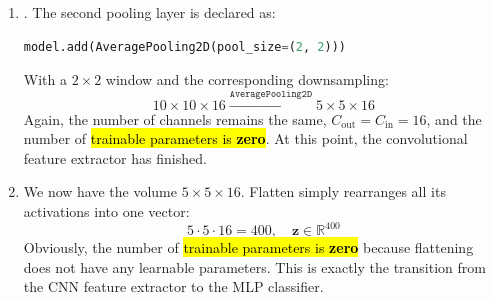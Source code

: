 \begin{enumerate}
    \highspace
    The number of \hl{trainable parameters} is:
    \begin{align*}
        \text{\# trainable parameters} &= C_{\text{out}} \left( K_h K_w C_{\text{in}} + 1 \right) \\
        &= 16 \left( 5 \cdot 5 \cdot 6 + 1 \right) \\
        &= 16 \left( 150 + 1 \right) \\
        &= 16 \cdot 151 \\
        &= 2416
    \end{align*}


    \item {}. The second pooling layer is declared as:
    \begin{lstlisting}[language=Python]
model.add(AveragePooling2D(pool_size=(2, 2)))
\end{lstlisting}
    With a $2 \times 2$ window and the corresponding downsampling:
    \begin{equation*}
        10 \times 10 \times 16 \xrightarrow{\texttt{AveragePooling2D}} 5 \times 5 \times 16
    \end{equation*}
    Again, the number of channels remains the same, $C_{\text{out}} = C_{\text{in}} = 16$, and the number of \hl{trainable parameters is \textbf{zero}}. At this point, the convolutional feature extractor has finished.


    \item {} We now have the volume $5 \times 5 \times 16$. Flatten simply rearranges all its activations into one vector:
    \begin{equation*}
        5 \cdot 5 \cdot 16 = 400, \quad \mathbf{z} \in \mathbb{R}^{400}
    \end{equation*}
    Obviously, the number of \hl{trainable parameters is \textbf{zero}} because flattening does not have any learnable parameters. This is exactly the transition from the CNN feature extractor to the MLP classifier.



\end{enumerate}
